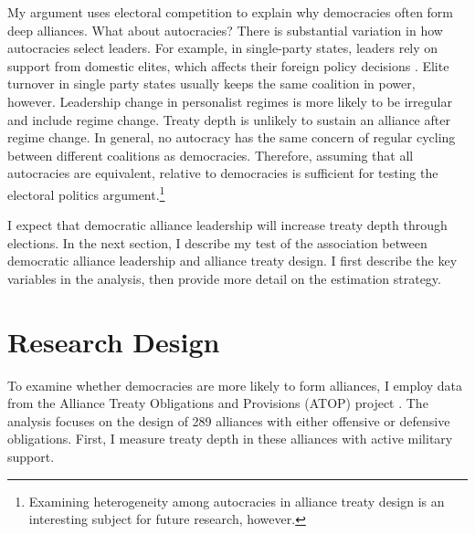 \documentclass[12pt]{article}
\begin{document}
My argument uses electoral competition to explain why democracies often form deep alliances. 
What about autocracies? 
There is substantial variation in how autocracies select leaders. 
For example, in single-party states, leaders rely on support from domestic elites, which affects their foreign policy decisions \citep{Weeks2014}.
Elite turnover in single party states usually keeps the same coalition in power, however.  
Leadership change in personalist regimes is more likely to be irregular and include regime change.
Treaty depth is unlikely to sustain an alliance after regime change.  
In general, no autocracy has the same concern of regular cycling between different coalitions as democracies.
Therefore, assuming that all autocracies are equivalent, relative to democracies is sufficient for testing the electoral politics argument.\footnote{Examining heterogeneity among autocracies in alliance treaty design is an interesting subject for future research, however.} 


I expect that democratic alliance leadership will increase treaty depth through elections. 
In the next section, I describe my test of the association between democratic alliance leadership and alliance treaty design. 
I first describe the key variables in the analysis, then provide more detail on the estimation strategy.



\section{Research Design}



To examine whether democracies are more likely to form alliances, I employ data from the Alliance Treaty Obligations and Provisions (ATOP) project \citep{Leedsetal2002}. 
The analysis focuses on the design of 289 alliances with either offensive or defensive obligations.
First, I measure treaty depth in these alliances with active military support. 
\end{document}
